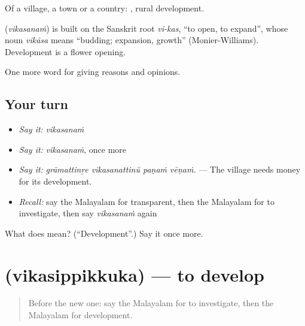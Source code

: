 Of a village, a town or a country: , rural development.

\begin{cousinweb}
\textbf{} (\emph{vikasanaṁ}) is built on the Sanskrit root \emph{vi-kas}, \textquotedblleft{}to open, to expand\textquotedblright{}, whose noun \emph{vikāsa} means \textquotedblleft{}budding; expansion, growth\textquotedblright{} (Monier-Williams). Development is a flower opening.
\end{cousinweb}

\begin{grammarlens}[title={What you've built}]
One more word for giving reasons and opinions.
\end{grammarlens}

\subsection*{Your turn}
\begin{itemize}
\raggedright
  \item \emph{Say it:} \emph{vikasanaṁ}
  \item \emph{Say it:} \emph{vikasanaṁ}, once more
  \item \emph{Say it:} \emph{grāmattinṟe vikasanattinŭ paṇaṁ vēṇaṁ.} — The village needs money for its development.
  \item \emph{Recall:} say the Malayalam for transparent, then the Malayalam for to investigate, then say \emph{vikasanaṁ} again
\end{itemize}

\begin{tcolorbox}[breakable,colback=teal!4,colframe=teal!35!black,title={Before you move on}]
What does  mean? (\textquotedblleft{}Development\textquotedblright{}.) Say it once more.
\end{tcolorbox}
\section[\texorpdfstring{\ml{വികസിപ്പിക്കുക} (vikasippikkuka)}{വികസിപ്പിക്കുക (vikasippikkuka)}]{ (vikasippikkuka) — to develop}

\label{lesson:ML-C431-vikasippikkuka}



\begin{quote}
Before the new one: say the Malayalam for to investigate, then the Malayalam for development.
\end{quote}

